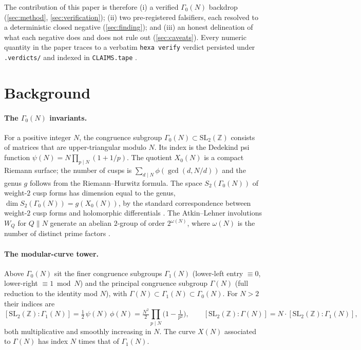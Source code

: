 \documentclass[11pt,a4paper]{article}
\newcommand{\Gz}{\Gamma_0}
\newcommand{\Go}{\Gamma_1}
\theoremstyle{definition}
\begin{document}
The contribution of this paper is therefore (i) a verified $\Gz(N)$ backdrop
(\textsection\ref{sec:method}, \textsection\ref{sec:verification}); (ii) two
pre-registered falsifiers, each resolved to a deterministic closed negative
(\textsection\ref{sec:finding}); and (iii) an honest delineation of what each
negative does and does not rule out (\textsection\ref{sec:caveats}). Every
numeric quantity in the paper traces to a verbatim \texttt{hexa verify} verdict
persisted under \texttt{.verdicts/} and indexed in \texttt{CLAIMS.tape}
\citep{tecs-l-claims}.

\section{Background}
\label{sec:background}

\paragraph{The $\Gz(N)$ invariants.} For a positive integer $N$, the congruence
subgroup $\Gz(N) \subset \mathrm{SL}_2(\mathbb{Z})$ consists of matrices that are
upper-triangular modulo $N$. Its index is the Dedekind psi function
$\psi(N) = N\prod_{p\mid N}(1+1/p)$. The quotient $X_0(N)$ is a compact Riemann
surface; the number of cusps is $\sum_{d\mid N}\phi(\gcd(d,N/d))$ and the genus
$g$ follows from the Riemann--Hurwitz formula. The space $S_2(\Gz(N))$ of
weight-$2$ cusp forms has dimension equal to the genus,
$\dim S_2(\Gz(N)) = g(X_0(N))$, by the standard correspondence between weight-$2$
cusp forms and holomorphic differentials \citep{diamond-shurman}. The
Atkin--Lehner involutions $W_Q$ for $Q\| N$ generate an abelian $2$-group of
order $2^{\omega(N)}$, where $\omega(N)$ is the number of distinct prime factors
\citep{atkin-lehner}.

\paragraph{The modular-curve tower.} Above $\Gz(N)$ sit the finer congruence
subgroups $\Go(N)$ (lower-left entry $\equiv 0$, lower-right $\equiv 1 \bmod N$)
and the principal congruence subgroup $\Gamma(N)$ (full reduction to the
identity mod $N$), with $\Gamma(N)\subset\Go(N)\subset\Gz(N)$. For $N>2$ their
indices are
\[
  [\mathrm{SL}_2(\mathbb{Z}):\Go(N)] = \tfrac{1}{2}\,\psi(N)\,\phi(N)
    = \tfrac{N^2}{2}\prod_{p\mid N}\!\bigl(1-\tfrac{1}{p^2}\bigr),
  \qquad
  [\mathrm{SL}_2(\mathbb{Z}):\Gamma(N)] = N\cdot[\mathrm{SL}_2(\mathbb{Z}):\Go(N)],
\]
both multiplicative and smoothly increasing in $N$. The curve $X(N)$ associated
to $\Gamma(N)$ has index $N$ times that of $\Go(N)$.
\end{document}
